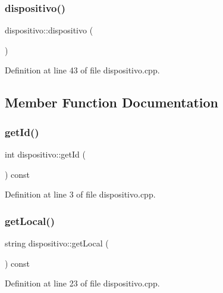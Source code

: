 \subsubsection{\texorpdfstring{dispositivo()}{dispositivo()}}
{\footnotesize\ttfamily dispositivo\+::dispositivo (\begin{DoxyParamCaption}{ }\end{DoxyParamCaption})}



Definition at line 43 of file dispositivo.\+cpp.



\subsection{Member Function Documentation}
\hypertarget{classdispositivo_a067622c9fc2f0fc431f59593dd083848}{}\label{classdispositivo_a067622c9fc2f0fc431f59593dd083848} 
\subsubsection{\texorpdfstring{get\+Id()}{getId()}}
{\footnotesize\ttfamily int dispositivo\+::get\+Id (\begin{DoxyParamCaption}{ }\end{DoxyParamCaption}) const}



Definition at line 3 of file dispositivo.\+cpp.

\hypertarget{classdispositivo_a0847829a4ec7d11882f1bd55e0849672}{}\label{classdispositivo_a0847829a4ec7d11882f1bd55e0849672} 
\subsubsection{\texorpdfstring{get\+Local()}{getLocal()}}
{\footnotesize\ttfamily string dispositivo\+::get\+Local (\begin{DoxyParamCaption}{ }\end{DoxyParamCaption}) const}



Definition at line 23 of file dispositivo.\+cpp.

\hypertarget{classdispositivo_a1157605bedafd71756b5cfcb7fced335}{}\label{classdispositivo_a1157605bedafd71756b5cfcb7fced335} 
